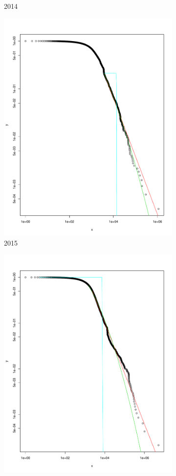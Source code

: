\documentclass[preprint,12pt]{elsarticle}
\begin{document}
\begin{figure}[H]
\begin{subfigure}{.3\textwidth}
  \caption{2014}
  \label{fig:2014in}
\end{subfigure}
\begin{subfigure}{.3\textwidth}
  \centering
  \includegraphics[width=.8\linewidth]{Bitcoin-graphs/deg-dist-in-2015.pdf}  
  \caption{2015}
  \label{fig:2015in}
\end{subfigure}
\begin{subfigure}{.3\textwidth}
  \centering
  \includegraphics[width=.8\linewidth]{Bitcoin-graphs/deg-dist-2016-in.pdf}  

\end{subfigure}
\end{figure}
\end{document}
